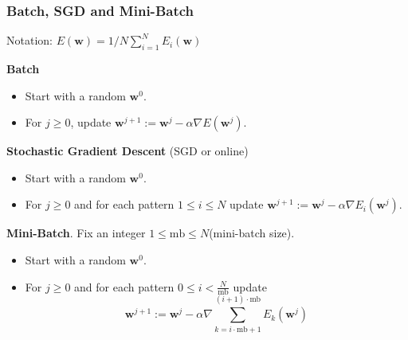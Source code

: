 \documentclass{beamer}
\begin{document}
	\begin{frame}
		\frametitle{Batch, SGD and Mini-Batch}
		Notation: $E(\bm{w}) = 1/N \sum_{i=1}^N E_i(\bm{w})$
		
		\vspace{5mm}
		
		\textbf{Batch}
		\begin{itemize}
			\item Start with a random $\bm{w}^0$.
			\item For $j \geq 0$, update $\bm{w}^{j+1} := \bm{w}^{j} - \alpha \nabla E(\bm{w}^j)$.
		\end{itemize}
		
		\textbf{Stochastic Gradient Descent} (SGD or online)
		\begin{itemize}
			\item Start with a random $\bm{w}^0$.
			\item For $j \geq 0$ and for each pattern $1\leq i \leq N$ update $\bm{w}^{j+1} := \bm{w}^{j} - \alpha \nabla E_i(\bm{w}^j)$.
		\end{itemize}
	
		\textbf{Mini-Batch}. Fix an integer $1 \leq \text{mb} \leq N$(mini-batch size).
		\begin{itemize}
			\item Start with a random $\bm{w}^0$.
			\item For $j \geq 0$ and for each pattern $0 \leq i < \frac{N}{\text{mb}}$ update
			\begin{equation*}
				\bm{w}^{j+1} := \bm{w}^{j} - \alpha \nabla \sum_{k=i\cdot\text{mb} + 1}^{(i+1)\cdot\text{mb}}E_k(\bm{w}^j)
			\end{equation*}
		\end{itemize}
		
	\end{frame}
\end{document}
